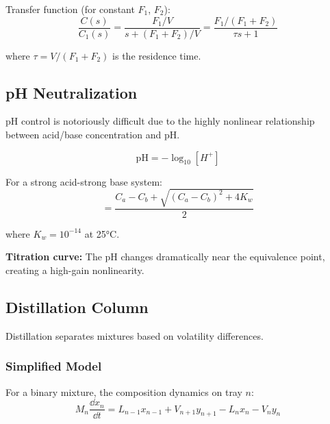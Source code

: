 Transfer function (for constant $F_1$, $F_2$):
\begin{equation}
\frac{C(s)}{C_1(s)} = \frac{F_1/V}{s + (F_1+F_2)/V} = \frac{F_1/(F_1+F_2)}{\tau s + 1}
\end{equation}

where $\tau = V/(F_1 + F_2)$ is the residence time.

\subsection{pH Neutralization}
\label{subsec:ph}

pH control is notoriously difficult due to the highly nonlinear relationship between acid/base concentration and pH.

\begin{equation}
\text{pH} = -\log_{10}[H^+]
\end{equation}

For a strong acid-strong base system:
\begin{equation}
[H^+] = \frac{C_a - C_b + \sqrt{(C_a - C_b)^2 + 4K_w}}{2}
\end{equation}

where $K_w = 10^{-14}$ at 25°C.

\textbf{Titration curve:} The pH changes dramatically near the equivalence point, creating a high-gain nonlinearity.



\subsection{Distillation Column}
\label{subsec:distillation}

Distillation separates mixtures based on volatility differences.



\subsubsection{Simplified Model}

For a binary mixture, the composition dynamics on tray $n$:
\begin{equation}
M_n\frac{\dd x_n}{\dd t} = L_{n-1}x_{n-1} + V_{n+1}y_{n+1} - L_n x_n - V_n y_n
\end{equation}

